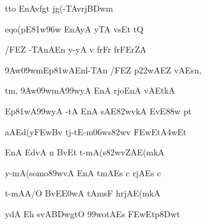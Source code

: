 {\dn tto EnAvfgt\2 jg(-TAvrj\3BDwm \vegdn\dontdisplaylinenum}

{\dn eqo(pE\381w\396w EnAyA yTA vsEt tQ \dontdisplaylinenum}

{\dn /FEZ -TAnAEn y-yA v\4 frFr\? frFErZA \vegdn\dontdisplaylinenum}

{\dn \39Aw\?\309wmEp\381wAEnl-TAn\? /FEZ p\322wAEZ vAEsn,{\dandabdn} \dontdisplaylinenum}

{\dn tm, \39Aw\?\309wmA\399wyA EnA rjoEnA  vAEtkA \vegdn\dontdisplaylinenum}

{\dn Ep\381wA\399wyA\2 -tA\2 EnA\2 sAE\382wvkA\2 EvE\388w pt\?{\dandabdn} \dontdisplaylinenum}

{\dn aAEd(y\3FEwBv\2 t\?j-tE-m\306ws\382wv\2 \3FEwEt\3A4wEt \vegdn\dontdisplaylinenum}

{\dn EnA EdvA n BvEt t-mA(s\382wvZAE(mkA{\dandabdn} \dontdisplaylinenum}

{\dn y-mA(somo\389wvA EnA tmA\2Es c rjA\2Es c \vegdn\dontdisplaylinenum}

{\dn t-mAA/O Bv\?E\3E0wA tAmsF hrjAE(mkA{\dandabdn} \dontdisplaylinenum}

{\dn ydA Eh svA\0\3BDwgtO \399wotA\2Es \3FEwEtp\38Dwt\? \vegdn\dontdisplaylinenum}

